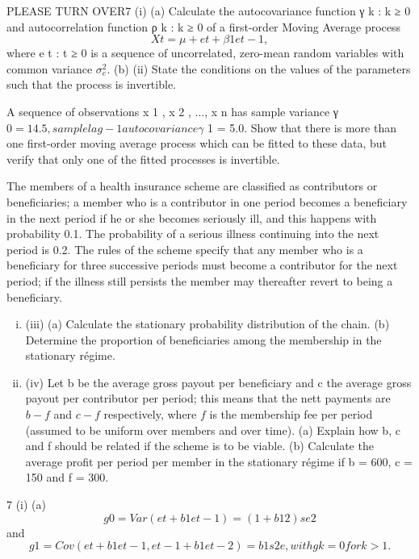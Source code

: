 \documentclass[a4paper,12pt]{article}
\begin{document}
\begin{enumerate}
PLEASE TURN OVER7
(i)
(a)
Calculate the autocovariance function {γ k : k ≥ 0} and autocorrelation function {ρ k : k ≥ 0} of a first-order Moving
Average process
\[X t = μ + e t + β 1 e t−1 ,\]
where {e t : t ≥ 0} is a sequence of uncorrelated, zero-mean random
variables with common variance $\sigma^2_e$.
(b)
(ii)
State the conditions on the values of the parameters such that the process is invertible.

A sequence of observations x 1 , x 2 , ..., x n has sample variance γ $ 0 = 14.5, sample lag-1 autocovariance γ $ 1 = 5.0. Show that there is more than one first-order moving average process which can be fitted to these data,
but verify that only one of the fitted processes is invertible.

The members of a health insurance scheme are classified as contributors or beneficiaries; a member who is a contributor in one period becomes a beneficiary in the next period if he or she becomes seriously ill, and this happens with probability 0.1. The probability of a serious illness continuing into the next period is 0.2. The rules of the scheme specify that any member
who is a beneficiary for three successive periods must become a contributor for the next period; if the illness still persists the member may thereafter revert to being a beneficiary.
\begin{enumerate}[(i)]
(i)
(a) Construct a discrete time Markov chain to model this health scheme, introducing if necessary various classes of beneficiaries
and contributors (a five state model is suggested).

(b) Draw the transition graph.
(c) Write down the transition matrix of the chain.
(ii) Explain whether the above Markov chain is irreducible, periodic or both.

\item (iii) (a)
Calculate the stationary probability distribution of the chain.
(b)
Determine the proportion of beneficiaries among the membership in the stationary régime.
\item (iv)
Let b be the average gross payout per beneficiary and c the average gross payout per contributor per period; this means that the nett
payments are $b − f$ and $c − f$ respectively, where $f$ is the membership fee per period (assumed to be uniform over members and over time).
(a) Explain how b, c and f should be related if the scheme is to be viable.
(b) Calculate the average profit per period per member in the stationary régime if b = 600, c = 150 and f = 300.
\end{enumerate}
7
(i)
(a)
\[g 0 = Var(e t + b 1 e t-1 ) = ( 1 + b 12 ) s e 2 \]and 
\[g 1 = Cov(e t + b 1 e t-1 , e t-1 + b 1 e t-2 )
= b 1 s 2 e , with g k = 0 for k > 1.\]


\end{enumerate}
\end{document}
